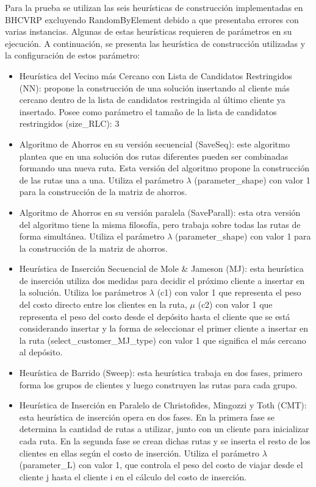 Para la prueba se utilizan las seis heurísticas de construcción implementadas en BHCVRP excluyendo RandomByElement debido a que presentaba errores con varias instancias. Algunas de estas heurísticas requieren de parámetros en su ejecución. A continuación, se presenta las heurística de construcción utilizadas y la configuración de estos parámetro:
\begin{itemize}
 \item Heurística del Vecino más Cercano con Lista de Candidatos Restringidos (NN): propone la construcción de una solución insertando al cliente más cercano dentro de la lista de candidatos restringida al último cliente ya insertado. Posee como parámetro el tamaño de la lista de candidatos restringidos (size\_RLC): 3
 \item Algoritmo de Ahorros en su versión secuencial (SaveSeq): este algoritmo plantea que en una solución dos rutas diferentes pueden ser combinadas formando una nueva ruta. Esta versión del algoritmo propone la construcción de las rutas una a una. Utiliza el parámetro $\lambda$ (parameter\_shape) con valor 1 para la construcción de la matriz de ahorros. 
 \item Algoritmo de Ahorros en su versión paralela (SaveParall): esta otra versión del algoritmo tiene la misma filosofía, pero trabaja sobre todas las rutas de forma simultánea. Utiliza el parámetro $\lambda$ (parameter\_shape) con valor 1 para la construcción de la matriz de ahorros.
 \item Heurística de Inserción Secuencial de Mole \& Jameson (MJ): esta heurística de inserción utiliza dos medidas para decidir el próximo cliente a insertar en la solución. Utiliza los parámetros $\lambda$ (c1) con valor 1 que representa el peso del costo directo entre los clientes en la ruta, $\mu$ (c2) con valor 1 que representa el peso del costo desde el depósito hasta el cliente que se está considerando insertar y la forma de seleccionar el primer cliente a insertar en la ruta (select\_customer\_MJ\_type) con valor 1 que significa el más cercano al depósito.
 \item Heurística de Barrido (Sweep): esta heurística trabaja en dos fases, primero forma los grupos de clientes y luego construyen las rutas para cada grupo.
 \item Heurística de Inserción en Paralelo de Christofides, Mingozzi y Toth (CMT): esta heurística de inserción opera en dos fases. En la primera fase se determina la cantidad de rutas a utilizar, junto con un cliente para inicializar cada ruta. En la segunda fase se crean dichas rutas y se inserta el resto de los clientes en ellas según el costo de inserción. Utiliza el parámetro $\lambda$ (parameter\_L) con valor 1, que controla el peso del costo de viajar desde el cliente j hasta el cliente i en el cálculo del costo de inserción.
\end{itemize}



